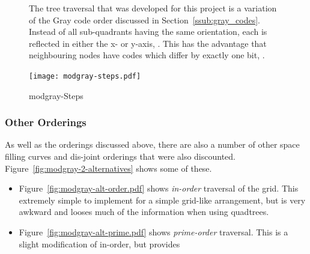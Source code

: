 \begin{figure}[tbhp]
\begin{subfigure}[c]{4.6cm}
        \caption{}\label{fig:modgray-2-levels-numbers.pdf}
    \end{subfigure}
    \caption{The tree traversal that was developed for this project is a
    	variation of the Gray code order discussed in
    	Section~\ref{ssub:gray_codes}.  Instead of all sub-quadrants having the
    	same orientation, each is reflected in either the x- or y-axis,
    	. This has the advantage that
		neighbouring nodes have codes which differ by exactly one bit,
		.} \label{fig:modgray-traversal}
\end{figure}

\begin{figure}[tbhp]
	\centering
	\texttt{[image: modgray-steps.pdf]}
	\caption{modgray-Steps}
	\label{fig:modgray-steps}
\end{figure}

\subsubsection{Other Orderings}
\label{ssub:other_orderings}

As well as the orderings discussed above, there are also a number of other
space filling curves and dis-joint orderings that were also discounted.
Figure~\ref{fig:modgray-2-alternatives} shows some of these.

\begin{itemize}

	\item Figure~\ref{fig:modgray-alt-order.pdf} shows \emph{in-order}
		traversal of the grid. This extremely simple to implement for a simple
		grid-like arrangement, but is very awkward and looses much of the
		information when using quadtrees.

	\item Figure~\ref{fig:modgray-alt-prime.pdf} shows \emph{prime-order}
		traversal. This is a slight modification of in-order, but provides 

\end{itemize}

